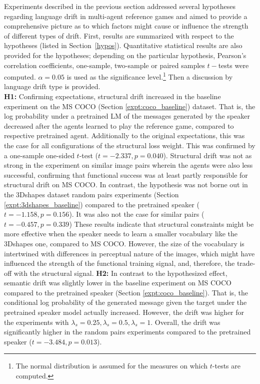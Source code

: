 Experiments described in the previous section addressed several hypotheses regarding language drift in multi-agent reference games and aimed to provide a comprehensive picture as to which factors might cause or influence the strength of different types of drift.
First, results are summarized with respect to the hypotheses (listed in Section~\ref{hypos}). Quantitative statistical results are also provided for the hypotheses; depending on the particular hypothesis, Pearson's correlation coefficients, one-sample, two-sample or paired samples $t-$tests were computed. $\alpha=0.05$ is used as the significance level.\footnote{The normal distribution is assumed for the measures on which $t$-tests are computed.}
Then a discussion by language drift type is provided.  \\
\newline
\textbf{H1:} Confirming expectations, structural drift increased in the baseline experiment on the MS COCO (Section \ref{expt:coco_baseline}) dataset. That is, the log probability under a pretrained LM of the messages generated by the speaker decreased after the agents learned to play the reference game, compared to respective pretrained agent. Additionally to the original expectations, this was the case for all configurations of the structural loss weight. This was confirmed by a one-sample one-sided $t$-test ($t = -2.337, p = 0.040$). Structural drift was not as strong in the experiment on similar image pairs wherein the agents were also less successful, confirming that functional success was at least partly responsible for structural drift on MS COCO.
In contrast, the hypothesis was not borne out in the 3Dshapes dataset random pairs experiments (Section \ref{expt:3dshapes_baseline}) compared to the pretrained speaker ($t = -1.158, p = 0.156$). It was also not the case for similar pairs ($t = -0.457, p = 0.339$)
These results indicate that structural constraints might be more effective when the speaker needs to learn a smaller vocabulary like the 3Dshapes one, compared to MS COCO. However, the size of the vocabulary is intertwined with differences in perceptual nature of the images, which might have influenced the strength of the functional training signal, and, therefore, the trade-off with the structural signal.\newline
\textbf{H2:} In contrast to the hypothesized effect, semantic drift was slightly lower in the baseline experiment on MS COCO compared to the pretrained speaker (Section \ref{expt:coco_baseline}). That is, the conditional log probability of the generated message given the target under the pretrained speaker model actually increased. However, the drift was higher for the experiments with $\lambda_s=0.25, \lambda_s=0.5, \lambda_s=1$. Overall, the drift was significantly higher in the random pairs experiments compared to the pretrained speaker ($t = -3.484, p = 0.013$).
